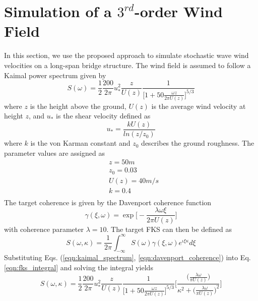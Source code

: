 \documentclass[preprint, review, 12pt]{elsarticle}
\begin{document}
\section{Simulation of a $3^{rd}$-order Wind Field}

In this section, we use the proposed approach to simulate stochastic wave wind velocities on a long-span bridge structure. The wind field is assumed to follow a Kaimal power spectrum \cite{Kaimal1972} given by
\begin{equation}
	S(\omega) = \frac{1}{2} \frac{200}{2\pi} u_{*}^{2} \frac{z}{U(z)} \frac{1}{\Big[1+50\frac{\omega z}{2\pi U(z)}\Big]^{5/3}}
	\label{eqn:kaimal_spectrum}
\end{equation}
where $z$ is the height above the ground, $U(z)$ is the average wind velocity at height $z$, and $u_{*}$ is the shear velocity defined as 
\begin{equation}
    u_{*} = \frac{kU(z)}{ln( z / z_{0})}
\end{equation}
where $k$ is the von Karman constant and $z_0$ describes the ground roughness. The parameter values are assigned as
\begin{equation}
\begin{aligned}
    & z = 50m \\
    & z_0 = 0.03 \\
    & U(z) = 40 m/s\\
    & k = 0.4 \\
\end{aligned}
\end{equation}
The target coherence is given by the Davenport \cite{Davenport1967} coherence function
\begin{equation}
    \gamma(\xi, \omega) = \exp \Big[ - \frac{\lambda \omega \xi}{2 \pi U(z)} \Big]
    \label{eqn:davenport_coherence}
\end{equation}
with coherence parameter $\lambda = 10$. The target FKS can then be defined as
\begin{equation}
    S(\omega, \kappa) = \frac{1}{2\pi} \int_{-\infty}^{\infty} S(\omega)\gamma(\xi, \omega) e^{\iota \xi \kappa} d\xi
    \label{eqn:fks_integral}
\end{equation}
Substituting Eqs. (\ref{eqn:kaimal_spectrum}, \ref{eqn:davenport_coherence}) into Eq. \eqref{eqn:fks_integral} and solving the integral yields \cite{Zhou2020}
\begin{equation}
    S(\omega, \kappa) = \frac{1}{2} \frac{200}{2\pi} u_{*}^{2} \frac{z}{U(z)} \frac{1}{\Big[1+50\frac{\omega z}{2\pi U(z)}\Big]^{5/3}} \Bigg[\frac{\Big(\frac{\lambda \omega}{\pi U(z)}\Big)}{\kappa^{2} + \Big(\frac{\lambda \omega}{\pi U(z)}\Big)^{2}}\Bigg]
    \label{eqn:kaimal_davenport_spectrum}
\end{equation}
\end{document}
